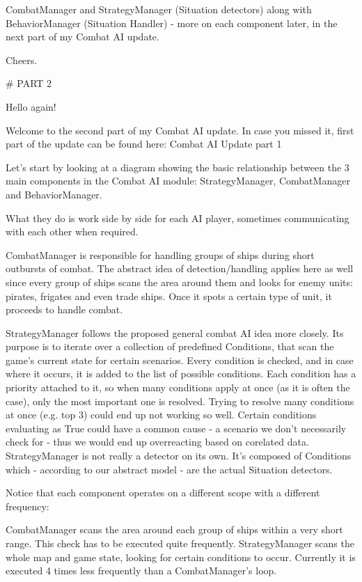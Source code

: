 CombatManager and StrategyManager (Situation detectors) along with BehaviorManager (Situation Handler) - more on each component later, in the next part of my Combat AI update.

Cheers.

# PART 2 



Hello again!

Welcome to the second part of my Combat AI update. In case you missed it, first part of the update can be found here: Combat AI Update part 1

Let's start by looking at a diagram showing the basic relationship between the 3 main components in the Combat AI module: StrategyManager, CombatManager and BehaviorManager.

What they do is work side by side for each AI player, sometimes communicating with each other when required.

CombatManager is responsible for handling groups of ships during short outbursts of combat. The abstract idea of detection/handling applies here as well since every group of ships scans the area around them and looks for enemy units: pirates, frigates and even trade ships. Once it spots a certain type of unit, it proceeds to handle combat.

StrategyManager follows the proposed general combat AI idea more closely. Its purpose is to iterate over a collection of predefined Conditions, that scan the game's current state for certain scenarios. 
Every condition is checked, and in case where it occurs, it is added to the list of possible conditions. 
Each condition has a priority attached to it, so when many conditions apply at once (as it is often the case), only the most important one is resolved. 
Trying to resolve many conditions at once (e.g. top 3) could end up not working so well. 
Certain conditions evaluating as True could have a common cause - a scenario we don't necessarily check for - thus we would end up overreacting based on corelated data. 
StrategyManager is not really a detector on its own. 
It's composed of Conditions which - according to our abstract model - are the actual Situation detectors.

Notice that each component operates on a different scope with a different frequency:

    CombatManager scans the area around each group of ships within a very short range. This check has to be executed quite frequently.
    StrategyManager scans the whole map and game state, looking for certain conditions to occur. 
	Currently it is executed 4 times less frequently than a CombatManager's loop.

